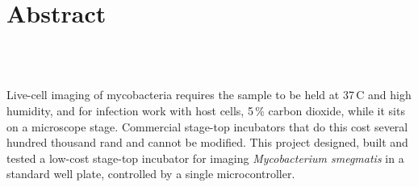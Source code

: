 \chapter{Abstract}				
\label{ch:abs}

%
\begin{center}
	\textbf{\Large \titl}\\
			\vskip 0.2cm
			\auth\\
			\vskip 0.2cm
	\textit{\footnotesize \FullDate}
			\vskip 1cm
\end{center}

Live-cell imaging of mycobacteria requires the sample to be held at 37\,\textdegree{}C and high humidity, and for infection work with host cells, 5\,\% carbon dioxide, while it sits on a microscope stage. Commercial stage-top incubators that do this cost several hundred thousand rand and cannot be modified. This project designed, built and tested a low-cost stage-top incubator for imaging \textit{Mycobacterium smegmatis} in a standard well plate, controlled by a single microcontroller.

